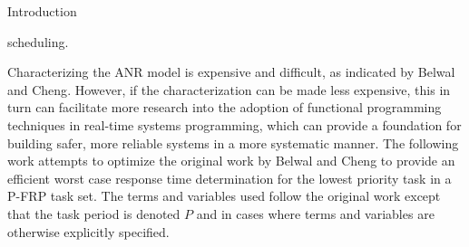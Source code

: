 \documentclass{article}
\begin{document}
\begin{section}{Introduction}
\begin{paragraph}{}
    scheduling\autocite[1]{BelwalCheng}.
  \end{paragraph}
  \begin{paragraph}{}
    Characterizing the ANR model is expensive and difficult, as indicated by Belwal
    and Cheng\autocite[2]{BelwalCheng}. However, if the characterization can be made less
    expensive, this in turn can facilitate more research into the adoption of functional
    programming techniques in real-time systems programming, which can provide a foundation
    for building safer, more reliable systems in a more systematic manner. The following work
    attempts to optimize the original work by Belwal and Cheng to provide an efficient
    worst case response time determination for the lowest priority task in a P-FRP task set.
    The terms and variables used follow the original work\autocite[3-4]{BelwalCheng} except that the
    task period is denoted $P$ and in cases where terms and variables are otherwise explicitly specified.
  \end{paragraph}
\end{section}
\end{document}
